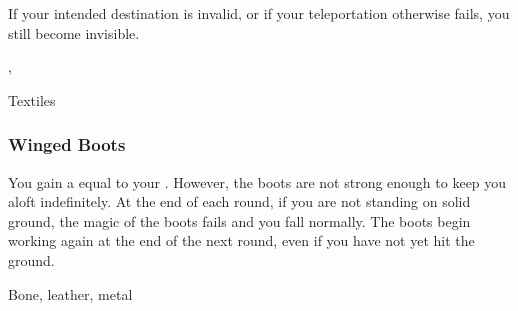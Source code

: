 If your intended destination is invalid, or if your teleportation otherwise fails, you still become invisible.



 , 


 Textiles


\lowercase{\hypertarget{item:Winged Boots}{}}\label{item:Winged Boots}
\hypertarget{item:Winged Boots}{\subsubsection{Winged Boots\hfill{}}}

You gain a  equal to your .
However, the boots are not strong enough to keep you aloft indefinitely.
At the end of each round, if you are not standing on solid ground, the magic of the boots fails and you fall normally.
The boots begin working again at the end of the next round, even if you have not yet hit the ground.



 Bone, leather, metal
